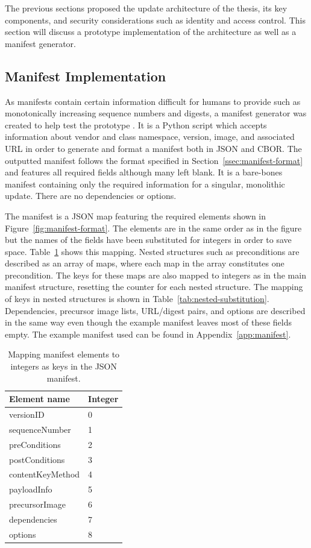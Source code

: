 \documentclass[0-thesis.tex]{subfiles}
\begin{document}
The previous sections proposed the update architecture of the thesis, its key components,
and security considerations such as identity and access control. This section will discuss
a prototype implementation of the architecture as well as a manifest generator. 

\subsection{Manifest Implementation}
\label{ssec:manifest-implementation}
As manifests contain certain information difficult for humans to provide such as
monotonically increasing sequence numbers and digests, a manifest generator was created to
help test the prototype \parencite{manifest-generator}. It is a Python script which
accepts information about vendor and class namespace, version, image, and associated URL
in order to generate and format a manifest both in JSON and CBOR. The outputted manifest
follows the format specified in Section~\ref{ssec:manifest-format} and features all
required fields although many left blank. It is a bare-bones manifest containing only the
required information for a singular, monolithic update. There are no dependencies or
options. 

The manifest is a JSON map featuring the required elements shown in
Figure~\ref{fig:manifest-format}. The elements are in the same order as in the figure but
the names of the fields have been substituted for integers in order to save space.
Table~\ref{tab:manifest-substitution} shows this mapping. Nested structures such as
preconditions are described as an array of maps, where each map in the array constitutes
one precondition. The keys for these maps are also mapped to integers as in the main
manifest structure, resetting the counter for each nested structure. The mapping of keys
in nested structures is shown in Table~\ref{tab:nested-substitution}. Dependencies,
precursor image lists, URL/digest pairs, and options are described in the same way even
though the example manifest leaves most of these fields empty. The example manifest used
can be found in Appendix~\ref{app:manifest}. 

\begin{longtable}[]{@{}ll@{}}
    \caption{Mapping manifest elements to integers as keys in the JSON manifest.}
    \label{tab:manifest-substitution}\\
    \toprule
    Element name & Integer\tabularnewline
    \midrule
    \endhead
    versionID & 0\tabularnewline
    sequenceNumber & 1\tabularnewline
    preConditions & 2\tabularnewline
    postConditions & 3\tabularnewline
    contentKeyMethod & 4\tabularnewline
    payloadInfo & 5\tabularnewline
    precursorImage & 6\tabularnewline
    dependencies & 7\tabularnewline
    options & 8\tabularnewline
    \bottomrule
\end{longtable}
\end{document}
